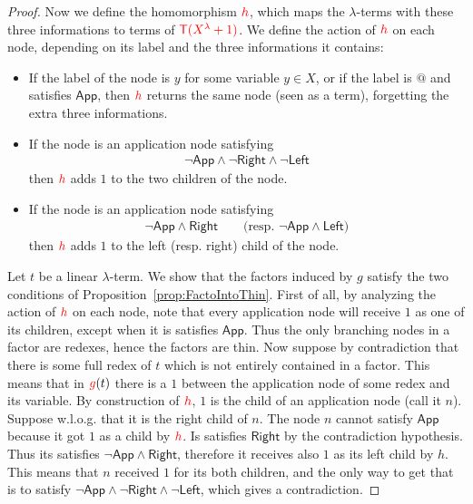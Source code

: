 \begin{proof}
Now we define the homomorphism ${\color{red}{h}}$, which maps the $\lambda$-terms with these three informations to terms of ${\color{red}{{\color{red}{\mathsf T}}({\color{red}{X^\lambda}}+1)}}$. We define the action of ${\color{red}{h}}$ on each node, depending on its label and the three informations it contains:
\begin{itemize}
\item If the label of the node is $y$  for some variable $y\in X$, or if the label is $@$ and satisfies $\mathsf{App}$, then ${\color{red}{h}}$ returns the same node (seen as a term), forgetting the extra three informations.
\item If the node is an application node satisfying 
\begin{align*}
\neg \mathsf{App} \wedge \neg \mathsf{Right} \wedge\neg \mathsf{Left} 
\end{align*} 
then ${\color{red}{h}}$ adds $1$ to the two children of the node.
\item If the node is an application node satisfying 
\begin{align*}
\neg \mathsf{App} \wedge \mathsf{Right} \qquad\text{(resp. } \neg \mathsf{App} \wedge \mathsf{Left} \text{)}
\end{align*} 
then ${\color{red}{h}}$ adds $1$ to the left (resp. right) child of the node. 
\end{itemize}
Let $t$ be a linear $\lambda$-term. We show that the factors induced by $g$ satisfy the two conditions of Proposition~\ref{prop:FactoIntoThin}. First of all, by analyzing the action of ${\color{red}{h}}$ on each node, note that every application node will receive $1$ as one of its children, except when it is satisfies $\mathsf{App}$. Thus the only branching nodes in a factor are redexes, hence the factors are thin. Now suppose by contradiction that there is some full redex  of $t$ which is not entirely contained in a factor. This means that in ${\color{red}{g}}(t)$ there is a $1$ between the application node of some redex  and its variable.
By construction of ${\color{red}{h}}$, $1$ is the child of an application node (call it $n$). Suppose w.l.o.g. that it is the right child of $n$. The node $n$ cannot satisfy $\mathsf{App}$ because it got $1$ as a child by ${\color{red}{h}}$. Is satisfies $\mathsf{Right}$ by the contradiction hypothesis. Thus its satisfies $\neg \mathsf{App} \wedge  \mathsf{Right}$, therefore it receives also $1$ as its left child by $h$. This means that $n$ received $1$ for its both children, and the only way to get that is to satisfy $\neg \mathsf{App} \wedge \neg \mathsf{Right} \wedge\neg \mathsf{Left}$, which gives a contradiction. 
\end{proof}

